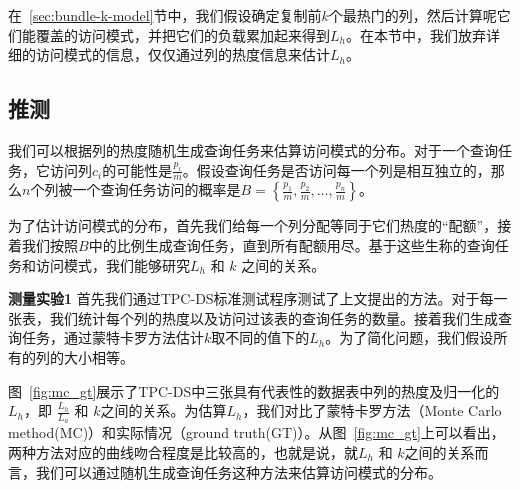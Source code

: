 \par 在~\ref{sec:bundle-k-model}节中，我们假设确定复制前$k$个最热门的列，然后计算呢它们能覆盖的访问模式，并把它们的负载累加起来得到$L_h$。在本节中，我们放弃详细的访问模式的信息，仅仅通过列的热度信息来估计$L_h$。

\subsection{推测}

\par 我们可以根据列的热度随机生成查询任务来估算访问模式的分布。对于一个查询任务，它访问列$c_i$的可能性是$\frac{p_i}{m}$。假设查询任务是否访问每一个列是相互独立的，那么$n$个列被一个查询任务访问的概率是$B = \left\{\frac{p_{1}}{m}, \frac{p_{2}}{m}, \dots, \frac{p_{n}}{m}\right\}$。

\par 为了估计访问模式的分布，首先我们给每一个列分配等同于它们热度的“配额”，接着我们按照$B$中的比例生成查询任务，直到所有配额用尽。基于这些生称的查询任务和访问模式，我们能够研究$L_h$ 和 $k$ 之间的关系。

\par \noindent \textbf{测量实验1} \quad 首先我们通过TPC-DS标准测试程序测试了上文提出的方法。对于每一张表，我们统计每个列的热度以及访问过该表的查询任务的数量。接着我们生成查询任务，通过蒙特卡罗方法估计$k$取不同的值下的$L_h$。为了简化问题，我们假设所有的列的大小相等。

\par 图~\ref{fig:mc_gt}展示了TPC-DS中三张具有代表性的数据表中列的热度及归一化的$L_h$，即 $\frac{L_h}{L_a}$ 和 $k$之间的关系。为估算$L_h$，我们对比了蒙特卡罗方法（Monte Carlo method(MC)）和实际情况（ground truth(GT)）。从图~\ref{fig:mc_gt}上可以看出，两种方法对应的曲线吻合程度是比较高的，也就是说，就$L_h$ 和 $k$之间的关系而言，我们可以通过随机生成查询任务这种方法来估算访问模式的分布。


